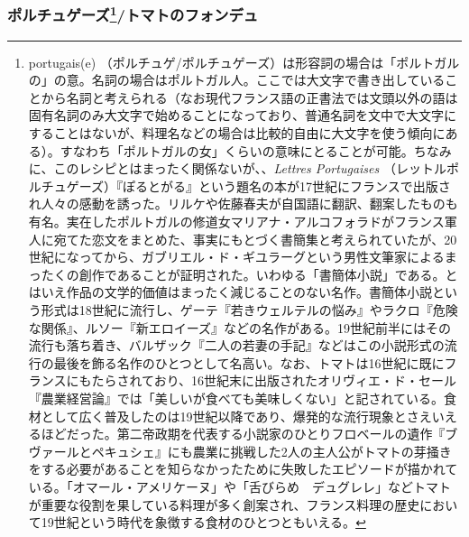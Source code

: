 \begin{recette}
\hypertarget{portugaise}{%
\subsubsection[ポルチュゲーズ/トマトのフォンデュ]{\texorpdfstring{ポルチュゲーズ\footnote{portugais(e)
  （ポルチュゲ/ポルチュゲーズ）は形容詞の場合は「ポルトガルの」の意。名詞の場合はポルトガル人。ここでは大文字で書き出していることから名詞と考えられる（なお現代フランス語の正書法では文頭以外の語は固有名詞のみ大文字で始めることになっており、普通名詞を文中で大文字にすることはないが、料理名などの場合は比較的自由に大文字を使う傾向にある）。すなわち「ポルトガルの女」くらいの意味にとることが可能。ちなみに、このレシピとはまったく関係ないが、、\emph{Lettres
  Portugaises}
  （レットルポルチュゲーズ）『ぽるとがる』という題名の本が17世紀にフランスで出版され人々の感動を誘った。リルケや佐藤春夫が自国語に翻訳、翻案したものも有名。実在したポルトガルの修道女マリアナ・アルコフォラドがフランス軍人に宛てた恋文をまとめた、事実にもとづく書簡集と考えられていたが、20世紀になってから、ガブリエル・ド・ギユラーグという男性文筆家によるまったくの創作であることが証明された。いわゆる「書簡体小説」である。とはいえ作品の文学的価値はまったく減じることのない名作。書簡体小説という形式は18世紀に流行し、ゲーテ『若きウェルテルの悩み』やラクロ『危険な関係』、ルソー『新エロイーズ』などの名作がある。19世紀前半にはその流行も落ち着き、バルザック『二人の若妻の手記』などはこの小説形式の流行の最後を飾る名作のひとつとして名高い。なお、トマトは16世紀に既にフランスにもたらされており、16世紀末に出版されたオリヴィエ・ド・セール『農業経営論』では「美しいが食べても美味しくない」と記されている。食材として広く普及したのは19世紀以降であり、爆発的な流行現象とさえいえるほどだった。第二帝政期を代表する小説家のひとりフロベールの遺作『ブヴァールとペキュシェ』にも農業に挑戦した2人の主人公がトマトの芽掻きをする必要があることを知らなかったために失敗したエピソードが描かれている。「オマール・アメリケーヌ」や「舌びらめ　デュグレレ」などトマトが重要な役割を果している料理が多く創案され、フランス料理の歴史において19世紀という時代を象徴する食材のひとつともいえる。}/トマトのフォンデュ}{ポルチュゲーズ/トマトのフォンデュ}}\label{portugaise}}




\end{recette}
